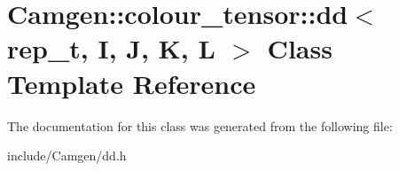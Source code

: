 \hypertarget{a00119}{\section{Camgen\-:\-:colour\-\_\-tensor\-:\-:dd$<$ rep\-\_\-t, I, J, K, L $>$ Class Template Reference}
\label{a00119}
}


The documentation for this class was generated from the following file\-:\begin{DoxyCompactItemize}
\item 
include/\-Camgen/dd.\-h\end{DoxyCompactItemize}

